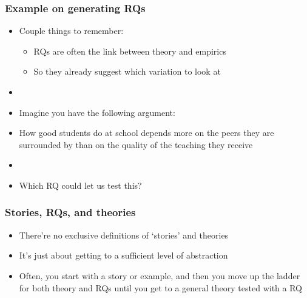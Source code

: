 \begin{frame}
\frametitle{Example on generating RQs}
\centering

\begin{itemize}
  \item<1-> Couple things to remember:
  \begin{itemize}
    \item RQs are often the link between theory and empirics
    \item So they already suggest which variation to look at
  \end{itemize}
  \item[]
  \item<2-> Imagine you have the following argument:
  \item[]<2-> How good students do at school depends more on the peers they are surrounded by than on the quality of the teaching they receive
  \item[]
  \item<2-> Which RQ could let us test this?
\end{itemize}

\end{frame}

\begin{frame}
\frametitle{Stories, RQs, and theories}
\centering

\begin{itemize}
  \item There're no exclusive definitions of `stories' and theories
  \item It's just about getting to a sufficient level of abstraction
  \item Often, you start with a story or example, and then you move up the ladder for both theory and RQs until you get to a general theory tested with a RQ
\end{itemize}

\end{frame}

